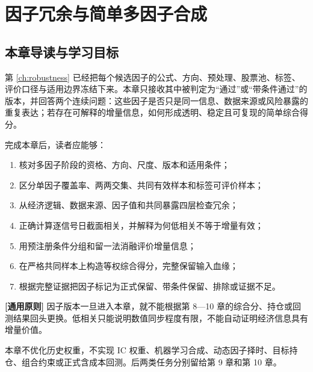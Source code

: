 \chapter{因子冗余与简单多因子合成}
\label{ch:factor-combination}

\section{本章导读与学习目标}

第 \cref{ch:robustness} 已经把每个候选因子的公式、方向、预处理、股票池、标签、评价口径与适用边界冻结下来。本章只接收其中被判定为“通过”或“带条件通过”的版本，并回答两个连续问题：这些因子是否只是同一信息、数据来源或风险暴露的重复表达；若存在可解释的增量信息，如何形成透明、稳定且可复现的简单综合得分。

完成本章后，读者应能够：

\begin{enumerate}
  \item 核对多因子阶段的资格、方向、尺度、版本和适用条件；
  \item 区分单因子覆盖率、两两交集、共同有效样本和标签可评价样本；
  \item 从经济逻辑、数据来源、因子值和共同暴露四层检查冗余；
  \item 正确计算逐信号日截面相关，并解释为何低相关不等于增量有效；
  \item 用预注册条件分组和留一法消融评价增量信息；
  \item 在严格共同样本上构造等权综合得分，完整保留输入血缘；
  \item 根据完整证据把因子标记为正式保留、带条件保留、排除或证据不足。
\end{enumerate}

\begin{principlebox}
\textbf{[通用原则]} 因子版本一旦进入本章，就不能根据第 8—10 章的综合分、持仓或回测结果回头更换。低相关只能说明数值同步程度有限，不能自动证明经济信息具有增量价值。
\end{principlebox}

本章不优化历史权重，不实现 IC 权重、机器学习合成、动态因子择时、目标持仓、组合约束或正式含成本回测。后两类任务分别留给第 9 章和第 10 章。

